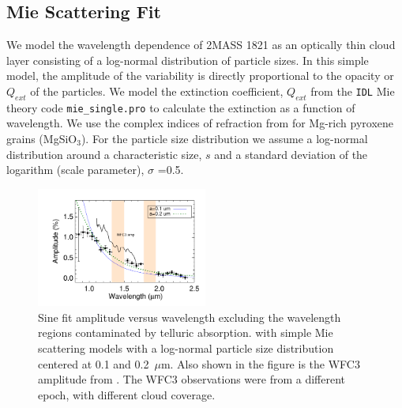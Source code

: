 \documentclass[twocolumn]{aastex6}
\begin{document}

\subsection{Mie Scattering Fit}

We model the wavelength dependence of 2MASS 1821 as an optically thin cloud layer consisting of a log-normal distribution of particle sizes.
In this simple model, the amplitude of the variability is directly proportional to the opacity or $Q_{ext}$ of the particles.
We model the extinction coefficient, $Q_{ext}$ from the \texttt{IDL} Mie theory code \texttt{mie\_single.pro} \citep{grainger04} to calculate the extinction as a function of wavelength.
We use the complex indices of refraction from \citet{dorschner95pyrox} for Mg-rich pyroxene grains (MgSiO$_3$).
For the particle size distribution we assume a log-normal distribution around a characteristic size, $s$ and a standard deviation of the logarithm (scale parameter), $\sigma$ =0.5.

\begin{figure}
\begin{centering}
\includegraphics[width=0.5\textwidth]{amp_vs_wavl_j1821_mie_sc.pdf}
\caption{Sine fit amplitude versus wavelength excluding the wavelength regions contaminated by telluric absorption. with simple Mie scattering models with a log-normal particle size distribution centered at 0.1 and 0.2~$\mu$m. Also shown in the figure is the WFC3 amplitude from \citet{yang2015hstRotBD}. The WFC3 observations were from a different epoch, with different cloud coverage.}\label{fig:ampspec1821mie}
\end{centering}
\end{figure}
\end{document}
